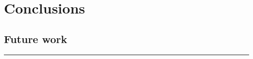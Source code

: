 \chapter{Conclusions} \label{ch:conclusions}
\todo

\section{Future work}
\todo

\noindent\rule{\textwidth}{0.4mm}
